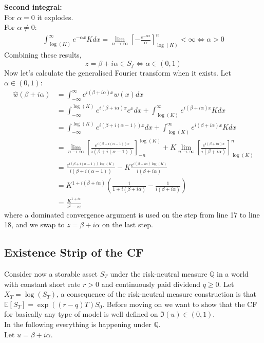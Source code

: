 \textbf{Second integral:}\\
For $\alpha=0$ it explodes.\\
For $\alpha\neq 0$:
\begin{align}
\int_{\log(K)}^{\infty}e^{-\alpha x}K dx = \lim_{n\to \infty}[-\frac{e^{-\alpha x}}{\alpha}]_{\log(K)}^n<\infty \Leftrightarrow \alpha>0
\end{align}
Combining these results,
\begin{equation}z= \beta+i \alpha \in S_f \Leftrightarrow \alpha \in (0,1)
\end{equation}
Now let's calculate the generalised Fourier transform when it exists.
Let $\alpha \in (0,1)$:
\begin{align}
    \hat{w} (\beta+i \alpha)&=\int_{-\infty}^{\infty}e^{i(\beta+i \alpha)x}w(x) dx\\
    &=\int_{-\infty}^{\log(K)}e^{i(\beta+i \alpha)x}e^x dx + \int_{\log(K)}^{\infty}e^{i(\beta+i \alpha)x}K dx\\
    &=\int_{-\infty}^{\log(K)}e^{i(\beta+i (\alpha-1))x} dx + \int_{\log(K)}^{\infty}e^{i(\beta+i \alpha)x}K dx\\
    &= \lim_{n\to \infty}[\frac{e^{i(\beta+i (\alpha-1))x}}{i(\beta+i (\alpha-1))}]^{\log(K)}_{-n}+K \lim_{n\to \infty}[\frac{e^{i(\beta+i \alpha)x}}{i(\beta+i \alpha)}]^{n}_{\log(K)}\\
    &= \frac{e^{i(\beta+i (\alpha-1))\log(K)}}{i(\beta+i (\alpha-1))} -K \frac{e^{i(\beta+i \alpha)\log(K)}}{i(\beta+i \alpha)}\\
    &= K^{ 1+i(\beta+i \alpha)}(\frac{1}{1+i(\beta+i \alpha)} -\frac{1}{i(\beta+i \alpha)})\\
    &=\frac{K^{1+iz}}{z^2-iz}
\end{align}
where a dominated convergence argument is used on the step from line 17 to line 18, and we swap to $z=\beta+i\alpha$ on the last step.

\subsection{Existence Strip of the CF}

Consider now a storable asset $S_T$ under the risk-neutral measure $\mathbb{Q}$ in a world with constant short rate $r>0$ and continuously paid dividend $q\geq0$. Let
$X_T=\log(S_T)$, a consequence of the risk-neutral measure construction is that $\mathbb{E}[S_T]=\exp((r-q)T)S_0$.
Before moving on we want to show that the CF for basically any type of model is well defined on $\Im(u)\in(0,1)$.\\
In the following everything is happening under $\mathbb{Q}$.\\
Let $u=\beta + i \alpha$.

